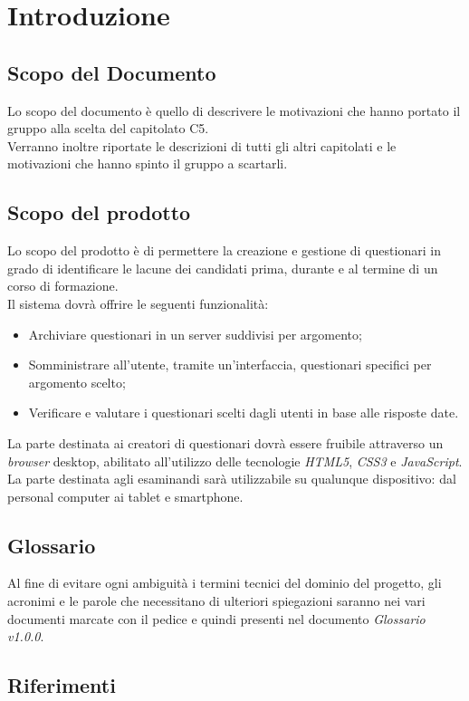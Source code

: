 \newpage
\section{Introduzione}

\subsection{Scopo del Documento}
Lo scopo del documento è quello di descrivere le motivazioni che hanno portato il gruppo alla scelta del capitolato C5. \\ Verranno inoltre riportate le descrizioni di tutti gli altri capitolati e le motivazioni che hanno spinto il gruppo a scartarli.
 
\subsection{Scopo del prodotto}
Lo scopo del prodotto è di permettere la creazione e gestione di questionari in grado di identificare le lacune dei candidati prima, durante e al termine di un corso di formazione. 
\\Il sistema dovrà offrire le seguenti funzionalità:
\begin{itemize}
	\item
	Archiviare questionari in un server suddivisi per argomento;
	\item
	Somministrare all'utente, tramite un'interfaccia, questionari specifici per argomento scelto;
	\item
	Verificare e valutare i questionari scelti dagli utenti in base alle risposte date.
\end{itemize}
La parte destinata ai creatori di questionari dovrà essere fruibile attraverso un \textit{browser} desktop, abilitato all'utilizzo delle tecnologie \textit{HTML5}, \textit{CSS3} e \textit{JavaScript}. La parte destinata agli esaminandi sarà utilizzabile su qualunque dispositivo: dal personal computer ai tablet e smartphone.

\subsection{Glossario}
Al fine di evitare ogni ambiguità i termini tecnici del dominio del progetto, gli acronimi e le parole che necessitano di ulteriori spiegazioni saranno nei vari documenti marcate con il pedice  e quindi presenti nel documento \textit{Glossario v1.0.0}.
\subsection{Riferimenti}

